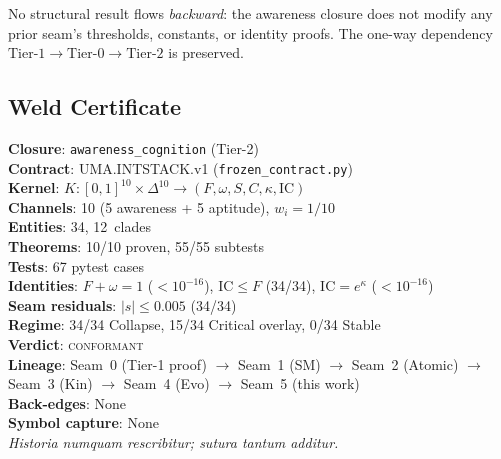 \documentclass[
  aps,
  prd,
  twocolumn,
  superscriptaddress,
  nofootinbib,
  floatfix
]{revtex4-2}
\newcommand{\IC}{\mathrm{IC}}
\begin{document}
No structural result flows \emph{backward}: the awareness
closure does not modify any prior seam's thresholds,
constants, or identity proofs.  The one-way dependency
$\text{Tier-1} \to \text{Tier-0} \to \text{Tier-2}$ is
preserved.

\subsection{Weld Certificate}

\noindent\textbf{Closure}: \texttt{awareness\_cognition}
(Tier-2)\\
\textbf{Contract}: UMA.INTSTACK.v1
(\texttt{frozen\_contract.py})\\
\textbf{Kernel}: $K\!: [0,1]^{10} \times \Delta^{10}
\to (F, \omega, S, C, \kappa, \IC)$\\
\textbf{Channels}: 10 (5 awareness + 5 aptitude),
$w_i = 1/10$\\
\textbf{Entities}: 34, 12~clades\\
\textbf{Theorems}: 10/10 proven, 55/55 subtests\\
\textbf{Tests}: 67 pytest cases\\
\textbf{Identities}: $F + \omega = 1$ ($< 10^{-16}$),
$\IC \leq F$ (34/34), $\IC = e^\kappa$ ($< 10^{-16}$)\\
\textbf{Seam residuals}: $|s| \leq 0.005$ (34/34)\\
\textbf{Regime}: 34/34 Collapse, 15/34 Critical overlay,
0/34 Stable\\
\textbf{Verdict}: \textsc{conformant}\\
\textbf{Lineage}: Seam~0 (Tier-1 proof) $\to$
Seam~1 (SM) $\to$ Seam~2 (Atomic) $\to$ Seam~3 (Kin)
$\to$ Seam~4 (Evo) $\to$ Seam~5 (this work)\\
\textbf{Back-edges}: None\\
\textbf{Symbol capture}: None\\

\noindent\emph{Historia numquam rescribitur; sutura tantum
additur.}


\end{document}
